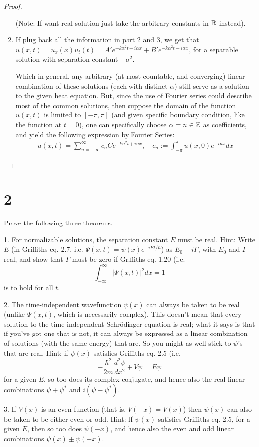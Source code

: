\documentclass{article}
\begin{document}
\begin{proof}
\begin{enumerate}
        (Note: If want real solution just take the arbitrary constants in $\mathbb{R}$ instead).

        \hfil
        
        \item If plug back all the information in part 2 and 3, we get that $u(x,t) = u_x(x)u_t(t)=A'e^{-k\alpha^2t + i\alpha x}+B'e^{-k\alpha^2t - i\alpha x}$, for a separable solution with separation constant $-\alpha^2$.
        
        Which in general, any arbitrary (at most countable, and converging) linear combination of these solutions (each with distinct $\alpha$) still serve as a solution to the given heat equation. But, since the use of Fourier series could describe most of the common solutions, then suppose the domain of the function $u(x,t)$ is limited to $[-\pi,\pi]$ (and given specific boundary condition, like the function at $t=0$), one can specifically choose $\alpha = n\in\mathbb{Z}$ as coefficients, and yield the following expression by Fourier Series:
        \begin{align}
            u(x,t)=\sum_{n=-\infty}^{\infty}c_n Ce^{-kn^2t+inx},\quad c_n :=\int_{-\pi}^{\pi}u(x,0)e^{-inx}dx
        \end{align}
    \end{enumerate}
\end{proof}

\hfil

\section*{2}
\begin{ques}\label{q2}
Prove the following three theorems:

1. For normalizable solutions, the separation constant $E$ must be real. Hint: Write $E$
(in Griffiths eq. 2.7, i.e. $\Psi(x, t) = \psi(x)e^{-iEt/\hbar}$) as $E_0 + i\Gamma$, with $E_0$ and $\Gamma$ real, and
show that $\Gamma$ must be zero if Griffiths eq. 1.20 (i.e.
\[
\int_{-\infty}^{\infty} |\Psi(x, t)|^2 dx = 1
\]
is to hold for all $t$.

2. The time-independent wavefunction $\psi(x)$ can always be taken to be real (unlike
$\Psi(x, t)$, which is necessarily complex). This doesn’t mean that every solution to the
time-independent Schrödinger equation is real; what it says is that if you’ve got one
that is not, it can always be expressed as a linear combination of solutions (with the
same energy) that are. So you might as well stick to $\psi$’s that are real. Hint: if $\psi(x)$
satisfies Griffiths eq. 2.5 (i.e.
\[
-\frac{\hbar^2}{2m}\frac{d^2\psi}{dx^2} + V\psi = E\psi
\]
for a given $E$, so too does its complex conjugate, and hence also the real linear combinations
$\psi+\psi^*$ and $i(\psi-\psi^*)$.

3. If $V(x)$ is an even function (that is, $V(-x) = V(x)$) then $\psi(x)$ can also be taken to
be either even or odd. Hint: If $\psi(x)$ satisfies Griffiths eq. 2.5, for a given $E$, then so
too does $\psi(-x)$, and hence also the even and odd linear combinations $\psi(x)\pm\psi(-x)$.
\end{ques}
\end{document}
